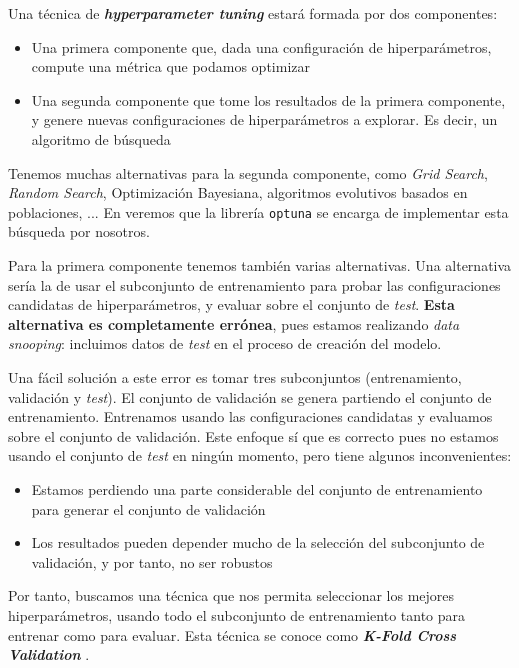 Una técnica de \textbf{\textit{hyperparameter tuning}} estará formada por dos componentes:

\begin{itemize}
    \item Una primera componente que, dada una configuración de hiperparámetros, compute una métrica que podamos optimizar
    \item Una segunda componente que tome los resultados de la primera componente, y genere nuevas configuraciones de hiperparámetros a explorar. Es decir, un algoritmo de búsqueda
\end{itemize}

Tenemos muchas alternativas para la segunda componente, como \textit{Grid Search}, \textit{Random Search}, Optimización Bayesiana, algoritmos evolutivos basados en poblaciones, ... \cite{informatica:review_algoritmos_hp} En  veremos que la librería \lstinline{optuna} se encarga de implementar esta búsqueda por nosotros.

Para la primera componente tenemos también varias alternativas. Una alternativa sería la de usar el subconjunto de entrenamiento para probar las configuraciones candidatas de hiperparámetros, y evaluar sobre el conjunto de \textit{test}. \textbf{Esta alternativa es completamente errónea}, pues estamos realizando \textit{data snooping}: incluimos datos de \textit{test} en el proceso de creación del modelo.

Una fácil solución a este error es tomar tres subconjuntos (entrenamiento, validación y \textit{test}). El conjunto de validación se genera partiendo el conjunto de entrenamiento. Entrenamos usando las configuraciones candidatas y evaluamos sobre el conjunto de validación. Este enfoque sí que es correcto pues no estamos usando el conjunto de \textit{test} en ningún momento, pero tiene algunos inconvenientes:

\begin{itemize}
    \item Estamos perdiendo una parte considerable del conjunto de entrenamiento para generar el conjunto de validación
    \item Los resultados pueden depender mucho de la selección del subconjunto de validación, y por tanto, no ser robustos
\end{itemize}

Por tanto, buscamos una técnica que nos permita seleccionar los mejores hiperparámetros, usando todo el subconjunto de entrenamiento tanto para entrenar como para evaluar. Esta técnica se conoce como \textbf{\textit{K-Fold Cross Validation}} \cite{informatica:kfold_cross_val_paper}.


